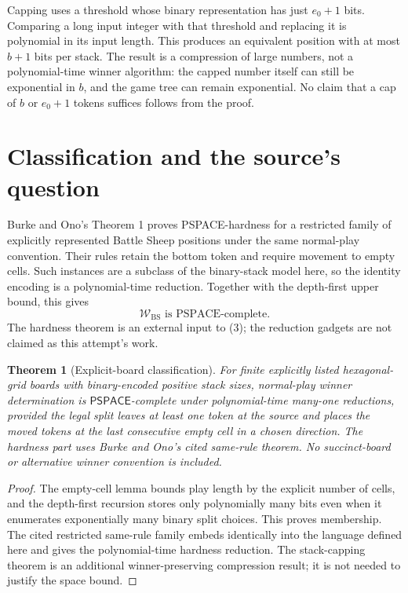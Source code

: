 \documentclass[11pt]{article}
\newtheorem{theorem}{Theorem}
\begin{document}
Capping uses a threshold whose binary representation has just $e_0+1$
bits. Comparing a long input integer with that threshold and replacing it
is polynomial in its input length. This produces an equivalent position
with at most $b+1$ bits per stack. The result is a compression of large
numbers, not a polynomial-time winner algorithm: the capped number itself
can still be exponential in $b$, and the game tree can remain exponential.
No claim that a cap of $b$ or $e_0+1$ tokens suffices follows from the proof.

\section*{Classification and the source's question}
Burke and Ono's Theorem 1 proves PSPACE-hardness for a restricted family
of explicitly represented Battle Sheep positions under the same
normal-play convention. Their rules retain the bottom token and require
movement to empty cells. Such instances are a subclass of the binary-stack
model here, so the identity encoding is a polynomial-time reduction.
Together with the depth-first upper bound, this gives
\[
                         \mathcal W_{\mathrm{BS}}
                         \text{ is PSPACE-complete}.             \tag{3}
\]
The hardness theorem is an external input to (3); the reduction gadgets
are not claimed as this attempt's work.

\begin{theorem}[Explicit-board classification]
For finite explicitly listed hexagonal-grid boards with binary-encoded
positive stack sizes, normal-play winner determination is
$\mathsf{PSPACE}$-complete under polynomial-time many-one reductions,
provided the legal split leaves at least one token at the source and
places the moved tokens at the last consecutive empty cell in a chosen
direction. The hardness part uses Burke and Ono's cited same-rule theorem.
No succinct-board or alternative winner convention is included.
\end{theorem}
\begin{proof}
The empty-cell lemma bounds play length by the explicit number of cells,
and the depth-first recursion stores only polynomially many bits even
when it enumerates exponentially many binary split choices. This proves
membership. The cited restricted same-rule family embeds identically
into the language defined here and gives the polynomial-time hardness
reduction. The stack-capping theorem is an additional winner-preserving
compression result; it is not needed to justify the space bound.
\end{proof}
\end{document}
